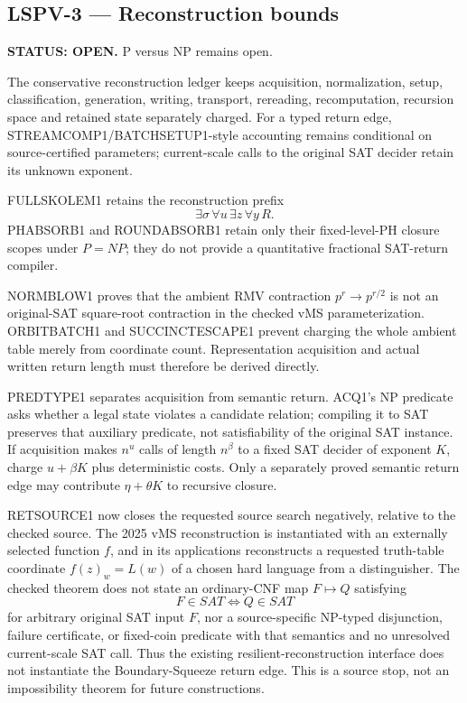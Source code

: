 \documentclass[11pt]{article}
\begin{document}
\subsection{LSPV-3 --- Reconstruction bounds}
\textbf{STATUS: OPEN.} P versus NP remains open.

The conservative reconstruction ledger keeps acquisition, normalization, setup, classification, generation, writing, transport, rereading, recomputation, recursion space and retained state separately charged. For a typed return edge, STREAMCOMP1/BATCHSETUP1-style accounting remains conditional on source-certified parameters; current-scale calls to the original SAT decider retain its unknown exponent.

FULLSKOLEM1 retains the reconstruction prefix
\[
\exists\sigma\,\forall u\,\exists z\,\forall y\,R.
\]
PHABSORB1 and ROUNDABSORB1 retain only their fixed-level-PH closure scopes under \(P=NP\); they do not provide a quantitative fractional SAT-return compiler.

NORMBLOW1 proves that the ambient RMV contraction \(p^r\to p^{r/2}\) is not an original-SAT square-root contraction in the checked vMS parameterization. ORBITBATCH1 and SUCCINCTESCAPE1 prevent charging the whole ambient table merely from coordinate count. Representation acquisition and actual written return length must therefore be derived directly.

PREDTYPE1 separates acquisition from semantic return. ACQ1's NP predicate asks whether a legal state violates a candidate relation; compiling it to SAT preserves that auxiliary predicate, not satisfiability of the original SAT instance. If acquisition makes \(n^u\) calls of length \(n^\beta\) to a fixed SAT decider of exponent \(K\), charge \(u+\beta K\) plus deterministic costs. Only a separately proved semantic return edge may contribute \(\eta+\theta K\) to recursive closure.

RETSOURCE1 now closes the requested source search negatively, relative to the checked source. The 2025 vMS reconstruction is instantiated with an externally selected function \(f\), and in its applications reconstructs a requested truth-table coordinate \(f(z)_w=L(w)\) of a chosen hard language from a distinguisher. The checked theorem does not state an ordinary-CNF map \(F\mapsto Q\) satisfying
\[
F\in SAT\iff Q\in SAT
\]
for arbitrary original SAT input \(F\), nor a source-specific NP-typed disjunction, failure certificate, or fixed-coin predicate with that semantics and no unresolved current-scale SAT call. Thus the existing resilient-reconstruction interface does not instantiate the Boundary-Squeeze return edge. This is a source stop, not an impossibility theorem for future constructions.
\end{document}
